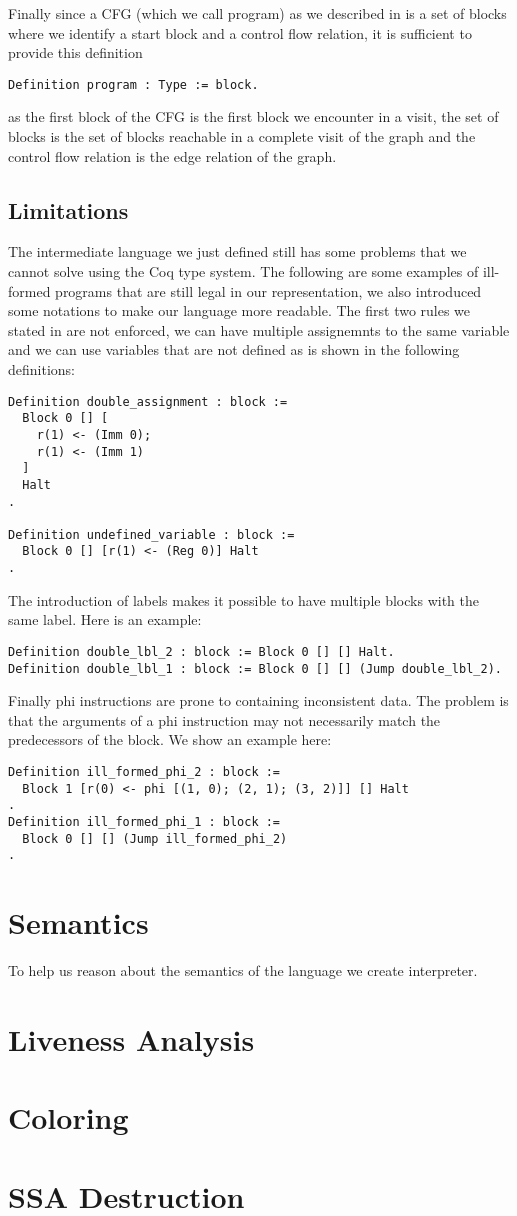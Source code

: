 Finally since a CFG (which we call program) as we described in  is a set of blocks where we identify a start block and a control flow relation, it is sufficient to provide this definition

\begin{lstlisting}[language=Coq]
Definition program : Type := block.
\end{lstlisting} as the first block of the CFG is the first block we encounter in a visit, the set of blocks is the set of blocks reachable in a complete visit of the graph and the control flow relation is the edge relation of the graph.

\subsection{Limitations}
The intermediate language we just defined still has some problems that we cannot solve using the Coq type system. The following are some examples of ill-formed programs that are still legal in our representation, we also introduced some notations to make our language more readable.
The first two rules we stated in  are not enforced, we can have multiple assignemnts to the same variable and we can use variables that are not defined as is shown in the following definitions:

\begin{lstlisting}[language=Coq]
Definition double_assignment : block :=
  Block 0 [] [
    r(1) <- (Imm 0);
    r(1) <- (Imm 1)
  ]
  Halt
.

Definition undefined_variable : block :=
  Block 0 [] [r(1) <- (Reg 0)] Halt
.
\end{lstlisting}

The introduction of labels makes it possible to have multiple blocks with the same label. Here is an example:

\begin{lstlisting}[language=Coq]
Definition double_lbl_2 : block := Block 0 [] [] Halt.
Definition double_lbl_1 : block := Block 0 [] [] (Jump double_lbl_2).
\end{lstlisting}

Finally phi instructions are prone to containing inconsistent data. The problem is that the arguments of a phi instruction may not necessarily match the predecessors of the block. We show an example here:

\begin{lstlisting}[language=Coq]
Definition ill_formed_phi_2 : block :=
  Block 1 [r(0) <- phi [(1, 0); (2, 1); (3, 2)]] [] Halt
.
Definition ill_formed_phi_1 : block :=
  Block 0 [] [] (Jump ill_formed_phi_2)
.
\end{lstlisting}


\section{Semantics}
To help us reason about the semantics of the language we create interpreter.

\section{Liveness Analysis}
\section{Coloring}
\section{SSA Destruction}